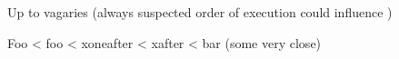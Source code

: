 \TEST

\edef\z{\the\numexpr65537+\pdfuniformdeviate100000}

\edef\testfoo{\noexpand\foo\z;65536;}%
\edef\testbar{\noexpand\bar\z;65536;}%
\edef\testFoo{\noexpand\Foo\z;65536;}%
\edef\testxafter{\noexpand\xafter\z;65536;}%
\edef\testxoneafter{\noexpand\xoneafter\z;65536;}%

\TEST

\bye

Up to vagaries (always suspected order of execution could influence \pdfelapsedtime)

Foo < foo < xoneafter < xafter < bar (some very close)
